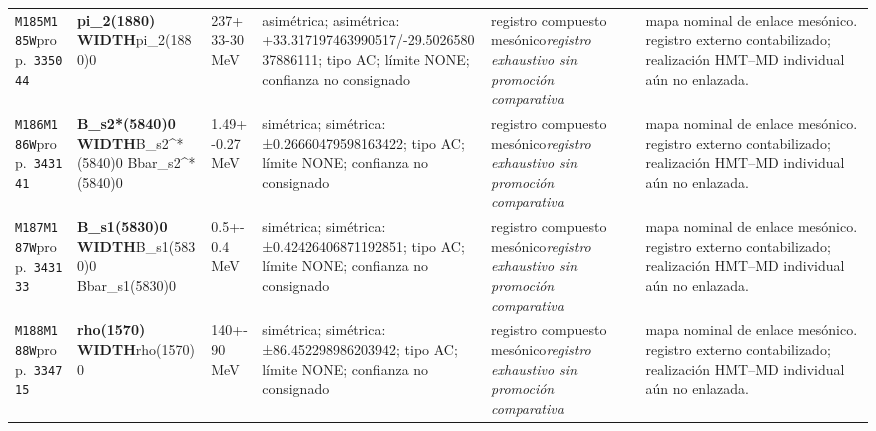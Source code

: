 \begin{landscape}
\begin{longtable}{L{1.85cm}L{4.45cm}L{2.35cm}L{4.05cm}L{3.35cm}L{7.15cm}}
\texttt{M185}\newline \texttt{M185W}\newline prop.\ \texttt{335044} & \textbf{pi\_\allowbreak{}2(1880) WIDTH}\newline pi\_\allowbreak{}2(1880)0 & 237+33-30\,MeV & asimétrica; asimétrica: +33.317197463990517/-29.502658037886111; tipo AC; límite NONE; confianza no consignado & registro compuesto mesónico\newline \emph{registro exhaustivo sin promoción comparativa} & mapa nominal de enlace mesónico. registro externo contabilizado; realización HMT--MD individual aún no enlazada. \\
\texttt{M186}\newline \texttt{M186W}\newline prop.\ \texttt{343141} & \textbf{B\_\allowbreak{}s2*(5840)0 WIDTH}\newline B\_\allowbreak{}s2\textasciicircum{}*(5840)0 \textbar{}\allowbreak{} Bbar\_\allowbreak{}s2\textasciicircum{}*(5840)0 & 1.49+-0.27\,MeV & simétrica; simétrica: ±0.26660479598163422; tipo AC; límite NONE; confianza no consignado & registro compuesto mesónico\newline \emph{registro exhaustivo sin promoción comparativa} & mapa nominal de enlace mesónico. registro externo contabilizado; realización HMT--MD individual aún no enlazada. \\
\texttt{M187}\newline \texttt{M187W}\newline prop.\ \texttt{343133} & \textbf{B\_\allowbreak{}s1(5830)0 WIDTH}\newline B\_\allowbreak{}s1(5830)0 \textbar{}\allowbreak{} Bbar\_\allowbreak{}s1(5830)0 & 0.5+-0.4\,MeV & simétrica; simétrica: ±0.42426406871192851; tipo AC; límite NONE; confianza no consignado & registro compuesto mesónico\newline \emph{registro exhaustivo sin promoción comparativa} & mapa nominal de enlace mesónico. registro externo contabilizado; realización HMT--MD individual aún no enlazada. \\
\texttt{M188}\newline \texttt{M188W}\newline prop.\ \texttt{334715} & \textbf{rho(1570) WIDTH}\newline rho(1570)0 & 140+-90\,MeV & simétrica; simétrica: ±86.452298986203942; tipo AC; límite NONE; confianza no consignado & registro compuesto mesónico\newline \emph{registro exhaustivo sin promoción comparativa} & mapa nominal de enlace mesónico. registro externo contabilizado; realización HMT--MD individual aún no enlazada. \\

\end{longtable}
\end{landscape}

